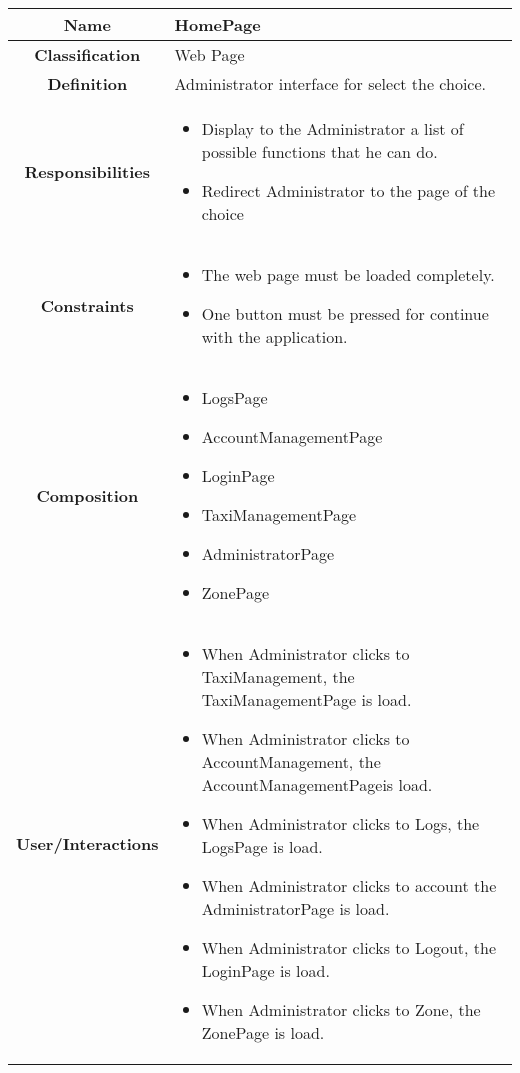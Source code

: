 \documentclass[11pt, a4paper,titlepage]{article}
\begin{document}
\begin{enumerate}
\begin{tabularx}{\textwidth}{| c | X |}
	\hline
	\textbf{Name} & 
	HomePage
	\\
	\hline
	\textbf{Classification} & 
	Web Page
	\\
	\hline
	\textbf{Definition} & 
	Administrator interface for select the choice.
	\\
	\hline
	\textbf{Responsibilities} &
	\begin{itemize}
		\item 
		Display to the Administrator a list of possible functions that he can do.
		\item Redirect Administrator to the page of the choice
	\end{itemize}
	\\
	\hline
	\textbf{Constraints} & 
	\begin{itemize}
		\item  The web page must be loaded completely.
		\item One button must be pressed for continue with the application.
	\end{itemize}
	\\
	\hline
	\textbf{Composition} & 
	\begin{itemize}
		\item LogsPage
		\item AccountManagementPage    
		\item LoginPage
		\item TaxiManagementPage    
		\item AdministratorPage
		\item ZonePage
	\end{itemize}
	\\
	\hline
	\textbf{User/Interactions} & 
	\begin{itemize}
		\item 
		When Administrator clicks to TaxiManagement, the TaxiManagementPage is load.        
		\item When Administrator clicks to AccountManagement, the AccountManagementPageis load.
		\item When Administrator  clicks to Logs, the LogsPage is load.
		\item When Administrator clicks to account the AdministratorPage is load.        
		\item When Administrator clicks to Logout, the LoginPage is load.
		\item When Administrator  clicks to Zone, the ZonePage is load.
	\end{itemize}	
	\\
	\hline	
\end{tabularx}


\end{enumerate}
\end{document}
